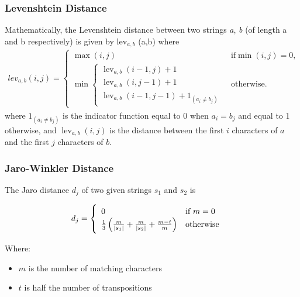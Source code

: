 \subsubsection{Levenshtein Distance}
Mathematically, the Levenshtein distance between two strings \textit{a}, \textit{b} (of length \text{\textbar}a\text{\textbar} and \text{\textbar}b\text{\textbar} respectively) is given by lev$_{a,b}$ (\text{\textbar}a\text{\textbar},\text{\textbar}b\text{\textbar}) where
\begin{align}
	lev_{a,b}(i,j) = 
	\begin{cases}
		\max(i,j) & \text{ if} \min(i,j)=0, \\
		\min \begin{cases}
			\operatorname{lev}_{a,b}(i-1,j) + 1 \\
			\operatorname{lev}_{a,b}(i,j-1) + 1 \\
			\operatorname{lev}_{a,b}(i-1,j-1) + 1_{(a_i \neq b_j)}
		\end{cases} & \text{ otherwise.}
	\end{cases}
\end{align}
where $1_{(a_i \neq b_j)}$ is the indicator function equal to $0$ when $a_i = b_j$ and equal to 1 otherwise, and $\operatorname{lev}_{a,b}(i,j)$ is the distance between the first $i$ characters of $a$ and the first $j$ characters of $b$.

\subsubsection{Jaro-Winkler Distance}
The Jaro distance $d_j$ of two given strings $s_1$ and $s_2$ is
 
\begin{align}
 d_j =\begin{cases}
 \begin{array}{l l}
 	0 & \text{if }m = 0\\
 	\frac{1}{3}\left(\frac{m}{|s_1|} + \frac{m}{|s_2|} + \frac{m-t}{m}\right) & \text{otherwise} \end{array} \end{cases}
\end{align}

Where: 
\vspace{-7mm} 
\begin{itemize}
	\item $m$ is the number of matching characters 
 	\item $t$ is half the number of transpositions
\end{itemize}

